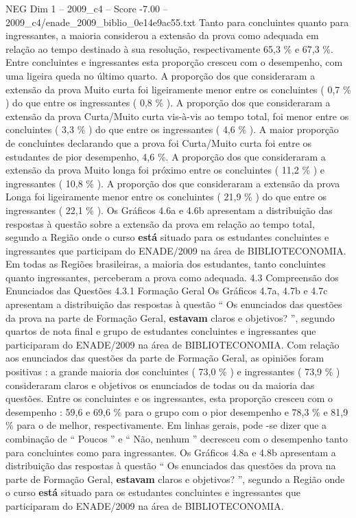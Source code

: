 \begin{textsample}{NEG Dim 1 – 2009\_c4 – Score -7.00 – 2009\_c4/enade\_2009\_biblio\_0e14e9ac55.txt}
Tanto para concluintes quanto para ingressantes, a maioria considerou a extensão da prova como adequada em relação ao tempo destinado à sua resolução, respectivamente 65,3 \% e 67,3 \%.
Entre concluintes e ingressantes esta proporção cresceu com o desempenho, com uma ligeira queda no último quarto.
A proporção dos que consideraram a extensão da prova Muito curta foi ligeiramente menor entre os concluintes ( 0,7 \% ) do que entre os ingressantes ( 0,8 \% ).
A proporção dos que consideraram a extensão da prova Curta/Muito curta vis-à-vis ao tempo total, foi menor entre os concluintes ( 3,3 \% ) do que entre os ingressantes ( 4,6 \% ).
A maior proporção de concluintes declarando que a prova foi Curta/Muito curta foi entre os estudantes de pior desempenho, 4,6 \%.
A proporção dos que consideraram a extensão da prova Muito longa foi próximo entre os concluintes ( 11,2 \% ) e ingressantes ( 10,8 \% ).
A proporção dos que consideraram a extensão da prova Longa foi ligeiramente menor entre os concluintes ( 21,9 \% ) do que entre os ingressantes ( 22,1 \% ).
Os Gráficos 4.6a e 4.6b apresentam a distribuição das respostas à questão sobre a extensão da prova em relação ao tempo total, segundo a Região onde o curso \textbf{está} situado para os estudantes concluintes e ingressantes que participam do ENADE/2009 na área de BIBLIOTECONOMIA.
Em todas as Regiões brasileiras, a maioria dos estudantes, tanto concluintes quanto ingressantes, perceberam a prova como adequada. 4.3 Compreensão dos Enunciados das Questões 4.3.1 Formação Geral Os Gráficos 4.7a, 4.7b e 4.7c apresentam a distribuição das respostas à questão “ Os enunciados das questões da prova na parte de Formação Geral, \textbf{estavam} claros e objetivos? ”, segundo quartos de nota final e grupo de estudantes concluintes e ingressantes que participaram do ENADE/2009 na área de BIBLIOTECONOMIA.
Com relação aos enunciados das questões da parte de Formação Geral, as opiniões foram positivas : a grande maioria dos concluintes ( 73,0 \% ) e ingressantes ( 73,9 \% ) consideraram claros e objetivos os enunciados de todas ou da maioria das questões.
Entre os concluintes e os ingressantes, esta proporção cresceu com o desempenho : 59,6 e 69,6 \% para o grupo com o pior desempenho e 78,3 \% e 81,9 \% para o de melhor, respectivamente.
Em linhas gerais, pode -se dizer que a combinação de “ Poucos ” e “ Não, nenhum ” decresceu com o desempenho tanto para concluintes como para ingressantes.
Os Gráficos 4.8a e 4.8b apresentam a distribuição das respostas à questão “ Os enunciados das questões da prova na parte de Formação Geral, \textbf{estavam} claros e objetivos? ”, segundo a Região onde o curso \textbf{está} situado para os estudantes concluintes e ingressantes que participaram do ENADE/2009 na área de BIBLIOTECONOMIA.

\end{textsample}
